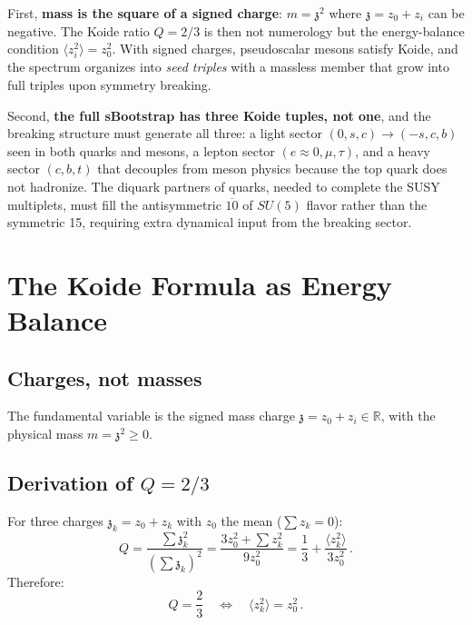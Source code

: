 \documentclass[12pt,a4paper]{article}
\newcommand{\zch}{\mathfrak{z}}
\begin{document}
First, \textbf{mass is the square of a signed charge}: $m = \zch^2$ 
where $\zch = z_0 + z_i$ can be negative. The Koide ratio $Q = 2/3$ 
is then not numerology but the energy-balance condition 
$\langle z_i^2\rangle = z_0^2$. With signed charges, pseudoscalar 
mesons satisfy Koide, and the spectrum organizes into \emph{seed 
triples} with a massless member that grow into full triples upon 
symmetry breaking.

Second, \textbf{the full sBootstrap has three Koide tuples, not one}, 
and the breaking structure must generate all three: a light sector 
$(0,s,c) \to (-s,c,b)$ seen in both quarks and mesons, a lepton 
sector $(e\!\approx\!0, \mu, \tau)$, and a heavy sector $(c,b,t)$ 
that decouples from meson physics because the top quark does not 
hadronize. The diquark partners of quarks, needed to complete the 
SUSY multiplets, must fill the antisymmetric $\overline{10}$ of 
$SU(5)$ flavor rather than the symmetric 15, requiring extra 
dynamical input from the breaking sector.

\section{The Koide Formula as Energy Balance}
\label{sec:koide_algebra}

\subsection{Charges, not masses}

The fundamental variable is the signed mass charge $\zch = z_0 + z_i 
\in \mathbb{R}$, with the physical mass $m = \zch^2 \geq 0$.

\subsection{Derivation of $Q = 2/3$}

For three charges $\zch_k = z_0 + z_k$ with $z_0$ the mean 
($\sum z_k = 0$):
\begin{equation}
Q = \frac{\sum \zch_k^2}{(\sum \zch_k)^2} 
= \frac{3z_0^2 + \sum z_k^2}{9z_0^2}
= \frac{1}{3} + \frac{\langle z_k^2\rangle}{3z_0^2}\,.
\end{equation}
Therefore:
\begin{equation}
\boxed{Q = \frac{2}{3} \quad\Longleftrightarrow\quad 
\langle z_k^2\rangle = z_0^2\,.}
\end{equation}
\end{document}
